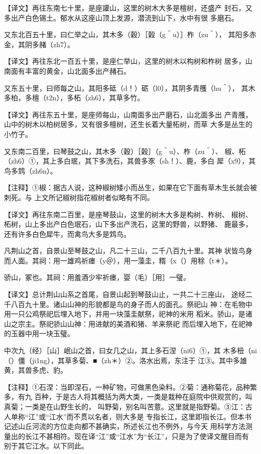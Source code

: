 \documentclass[a4paper,12pt,UTF8,twoside]{ctexbook}
\begin{document}
【译文】再往东南七十里，是座讙山，这里的树木大多是檀树，还盛产 封石，又多出产白色锡土。郁水从这座山顶上发源，潜流到山下，水中有很 多磨石。

又东北百五十里，曰仁举之山，其木多（穀）［榖（g＾u）］柞（zu＾）， 其阳多赤金，其阴多赭（zh7）。

【译文】再往东北一百五十里，是座仁举山，这里的树木以构树和柞树 居多，山南面有丰富的黄金，山北面多出产赭石。

又东五十里，曰师每之山，其阳多砥（d！）砺（l0），其阴多青雘（hu＾）， 其木多柏，多檀（t2n），多柘（zh6），其草多竹。

【译文】再往东五十里，是座师每山，山南面多出产磨石，山北面多出 产青雘，山中的树木以柏树居多，又有很多檀树，还生长着大量柘树，而草 大多是丛生的小竹子。

又东南二百里，曰琴鼓之山，其木多（穀）［榖］（g＾u）、柞（zu＾）、 椒、柘（zh6）①，其上多白珉，其下多洗石，其兽多豕（sh！）、鹿，多白 犀（x9），其鸟多鸩（zh6n）。

【注释】①椒：据古人说，这种椒树矮小而丛生，如果在它下面有草木生长就会被刺死。与 上文所记椒树指花椒树者似略有不同。

【译文】再往东南二百里，是座琴鼓山，这里的树木大多是构树、柞树、 椒树、柘树，山上多出产白色珉石，山下多出产洗石，这里的野兽，以野猪、 鹿最多，还有许多白色犀牛，而禽鸟大多是鸩鸟。

凡荆山之首，自景山至琴鼓之山，凡二十三山，二千八百九十里。其神 状皆鸟身而人面。其祠：用一雄鸡祈瘗（y＠），用一藻圭，糈（x（）用稌（t＊）。

骄山，冢也。其祠：用羞酒少牢祈瘗，婴（毛）［用］一璧。

【译文】总计荆山山系之首尾，自景山起到琴鼓山止，一共二十三座山， 途经二千八百九十里。诸山山神的形貌都是鸟的身子而人的面孔。祭祀山 神：在毛物中用一只公鸡祭祀后埋入地下，并用一块藻圭献祭，祀神的米用 稻米。骄山，是诸山之宗主。祭祀骄山山神：用进献的美酒和猪、羊来祭祀 而后埋入地下，在祀神的玉器中用一块玉璧。

中次九（经）［山］岷山之首，曰女几之山，其上多石涅（ni6）①，其 木多杻（ni（）僵（ji1ng），其草多菊、■（zh＊）②。洛水出焉，东注于 江③。其中多雄黄，其兽多虎、豹。

【注释】①石涅：当即涅石，一种矿物，可做黑色染料。②菊：通称菊花，品种繁多，有九 百种，于是古人将其概括为两大类，一类是栽种在庭院中供观赏的，叫真菊；一类是在山野生长的， 叫野菊，别名叫苦薏。这里就是指野菊。③江：古人单称“江”或“江水”而不贯以名者，则大多是 专指长江，这里即指长江。但本书记述山丘河流的方位走向都不甚确实，所述长江也不例外，与今天 用科学方法测量出的长江不甚相符。现在译“江”或“江水”为“长江”，只是为了使译文醒目而有 别于其它江水。以下同此。
\end{document}
